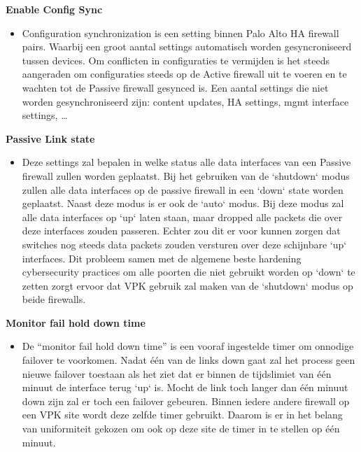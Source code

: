 \textbf{Enable Config Sync}
    \begin{itemize}[label=\textbullet]
        \item Configuration synchronization is een setting binnen Palo Alto HA firewall pairs. Waarbij een groot aantal settings automatisch worden gesyncroniseerd tussen devices. Om conflicten in configuraties te vermijden is het steeds aangeraden om configuraties steeds op de Active firewall uit te voeren en te wachten tot de Passive firewall gesynced is. Een aantal settings die niet worden gesynchroniseerd zijn: content updates, HA settings, mgmt interface settings, \ldots 
    \end{itemize}



\textbf{Passive Link state}
    \begin{itemize}[label=\textbullet]
        \item Deze settings zal bepalen in welke status alle data interfaces van een Passive firewall zullen worden geplaatst. Bij het gebruiken van de `shutdown` modus zullen alle data interfaces op de passive firewall in een `down` state worden geplaatst. Naast deze modus is er ook de `auto` modus. Bij deze modus zal alle data interfaces op `up` laten staan, maar dropped alle packets die over deze interfaces zouden passeren. Echter zou dit er voor kunnen zorgen dat switches nog steeds data packets zouden versturen over deze schijnbare `up` interfaces. Dit probleem samen met de algemene beste hardening cybersecurity practices om alle poorten die niet gebruikt worden op `down` te zetten zorgt ervoor dat VPK gebruik zal maken van de `shutdown` modus op beide firewalls.
    \end{itemize}



\textbf{Monitor fail hold down time}
    \begin{itemize}[label=\textbullet]
        \item De ``monitor fail hold down time'' is een vooraf ingestelde timer om onnodige failover te voorkomen. Nadat één van de links down gaat zal het process geen nieuwe failover toestaan als het ziet dat er binnen de tijdslimiet van één minuut de interface terug `up` is. Mocht de link toch langer dan één minuut down zijn zal er toch een failover gebeuren. Binnen iedere andere firewall op een VPK site wordt deze zelfde timer gebruikt. Daarom is er in het belang van uniformiteit gekozen om ook op deze site de timer in te stellen op één minuut.
    \end{itemize}



